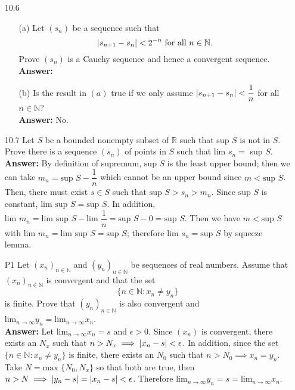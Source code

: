 \documentclass{article}
\begin{document}
\begin{itemize}
      \item [10.6] \begin{itemize}
                  \item [(a)] Let $(s_n)$ be a sequence such that \[\abs{s_{n+1}-s_n}<2^{-n} \text{ for all } n\in\mathbb{N}.\] Prove $(s_n)$ is a Cauchy sequence and hence a convergent sequence.\\
                  \textbf{Answer: }
                  \item [(b)] Is the result in $(a)$ true if we only assume $\abs{s_{n+1}-s_n}<\dfrac{1}{n}$ for all $n\in\mathbb{N}$?\\
                  \textbf{Answer: } No.
            \end{itemize}
      \item [10.7] Let $S$ be a bounded nonempty subset of $\mathbb{R}$ such that sup $S$ is not in $S$. Prove there is a sequence $(s_n)$ of points in $S$ such that $\text{lim }s_n=$ sup $S$.\\
      \textbf{Answer: } By definition of supremum, $\text{sup }S$ is the least upper bound; then we can take $m_n=\text{sup }S-\dfrac{1}{n}$ which cannot be an upper bound since $m<\text{sup }S$. Then, there must exist $s\in S$ such that $\text{sup }S>s_n>m_n$. Since $\text{sup }S$ is constant, $\text{lim sup }S=\text{sup }S$. In addition, $\text{lim }m_n=\text{lim sup }S-\text{lim }\dfrac{1}{n}=\text{sup }S-0=\text{sup }S$. Then we have $m<\text{sup }S$ with $\text{lim }m_n=\text{lim sup }S=\text{sup }S$; therefore $\text{lim }s_n=\text{sup }S$ by squeeze lemma.
      \item [P1] Let $(x_n)_{n\in\mathbb{N}}$ and $(y_n)_{n\in\mathbb{N}}$ be sequences of real numbers. Assume that $(x_n)_{n\in\mathbb{N}}$ is convergent and that the set \[\{n\in\mathbb{N}:x_n\neq y_n\}\] is finite. Prove that $(y_n)_{n\in\mathbb{N}}$ is also convergent and $\text{lim}_{n\rightarrow\infty}y_n=\text{lim}_{n\rightarrow\infty}x_n$.\\
      \textbf{Answer: } Let $\text{lim}_{n\rightarrow\infty}x_n=s$ and $\epsilon>0$. Since $(x_n)$ is convergent, there exists an $N_x$ such that $n>N_x\implies\abs{x_n-s}<\epsilon$. In addition, since the set $\{n\in\mathbb{N}:x_n\neq y_n\}$ is finite, there exists an $N_0$ such that $n>N_0\implies x_n=y_n$. Take $N=\text{max }\{N_0,N_x\}$ so that both are true, then $n>N\implies\abs{y_n-s}=\abs{x_n-s}<\epsilon$. Therefore  $\text{lim}_{n\rightarrow\infty}y_n=s=\text{lim}_{n\rightarrow\infty}x_n$.
\end{itemize}
\end{document}
